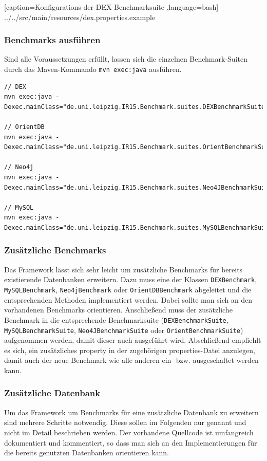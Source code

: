 \documentclass[11pt, a4paper, oneside]{article} %
\begin{document}

    [caption={Konfigurations der DEX-Benchmarksuite}
       \label{lst:inst_conf},language=bash]
 {../../src/main/resources/dex.properties.example}

\subsubsection{Benchmarks ausführen}
Sind alle Voraussetzungen erfüllt, lassen sich die einzelnen Benchmark-Suiten durch das Maven-Kommando \texttt{mvn exec:java} ausführen.

\begin{lstlisting}[caption={Ausführen der einzelnen Benchmarksuites},label={lst:inst_run}]
// DEX
mvn exec:java -Dexec.mainClass="de.uni.leipzig.IR15.Benchmark.suites.DEXBenchmarkSuite"

// OrientDB
mvn exec:java -Dexec.mainClass="de.uni.leipzig.IR15.Benchmark.suites.OrientBenchmarkSuite"

// Neo4j
mvn exec:java -Dexec.mainClass="de.uni.leipzig.IR15.Benchmark.suites.Neo4JBenchmarkSuite"

// MySQL
mvn exec:java -Dexec.mainClass="de.uni.leipzig.IR15.Benchmark.suites.MySQLBenchmarkSuite"
\end{lstlisting}

\subsubsection{Zusätzliche Benchmarks}
Das Framework lässt sich sehr leicht um zusätzliche Benchmarks für bereits existierende Datenbanken erweitern. Dazu muss eine der Klassen \texttt{DEXBenchmark}, \texttt{MySQLBenchmark}, \texttt{Neo4jBenchmark} oder \texttt{OrientDBBenchmark} abgeleitet und die entsprechenden Methoden implementiert werden. Dabei sollte man sich an den vorhandenen Benchmarks orientieren. Anschließend muss der zusätzliche Benchmark in die entsprechende Benchmarksuite (\texttt{DEXBenchmarkSuite}, \linebreak\texttt{MySQLBenchmarkSuite}, \texttt{Neo4JBenchmarkSuite} oder \texttt{OrientBenchmarkSuite}) aufgenommen werden, damit dieser auch ausgeführt wird. Abschließend empfiehlt es sich, ein zusätzliches property in der zugehörigen properties-Datei anzulegen, damit auch der neue Benchmark wie alle anderen ein- bzw. ausgeschaltet werden kann.

\subsubsection{Zusätzliche Datenbank}
Um das Framework um Benchmarks für eine zusätzliche Datenbank zu erweitern sind mehrere Schritte notwendig. Diese sollen im Folgenden nur genannt und nicht im Detail beschrieben werden. Der vorhandene Quellcode ist umfangreich dokumentiert und kommentiert, so dass man sich an den Implementierungen für die bereits genutzten Datenbanken orientieren kann. 
\end{document}
